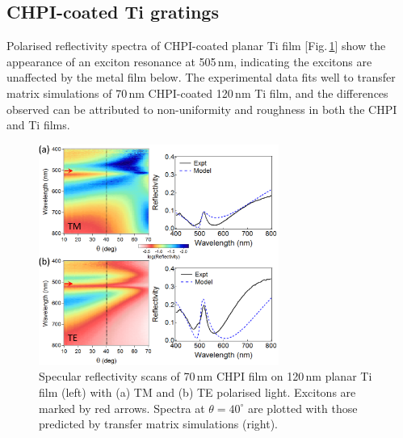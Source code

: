 \subsection{CHPI-coated Ti gratings}
Polarised reflectivity spectra of CHPI-coated planar Ti film [Fig.\,\ref{7Fig5}] show the appearance of an exciton resonance at 505\,nm, indicating the excitons are unaffected by the metal film below. The experimental data fits well to transfer matrix simulations of 70\,nm CHPI-coated 120\,nm Ti film, and the differences observed can be attributed to non-uniformity and roughness in both the CHPI and Ti films.
\begin{figure}[h!] 
\centering    
\includegraphics[width=0.7\textwidth]{Fig5}
\caption[(a) TM and (b) TE polarised reflectivity scans of 70\,nm CHPI film on 120\,nm planar Ti film compared to transfer matrix simulations.]{Specular reflectivity scans of 70\,nm CHPI film on 120\,nm planar Ti film (left) with (a) TM and (b) TE polarised light. Excitons are marked by red arrows. Spectra at $\theta=40^{\circ}$ are plotted with those predicted by transfer matrix simulations (right).}
\label{7Fig5}
\end{figure}

